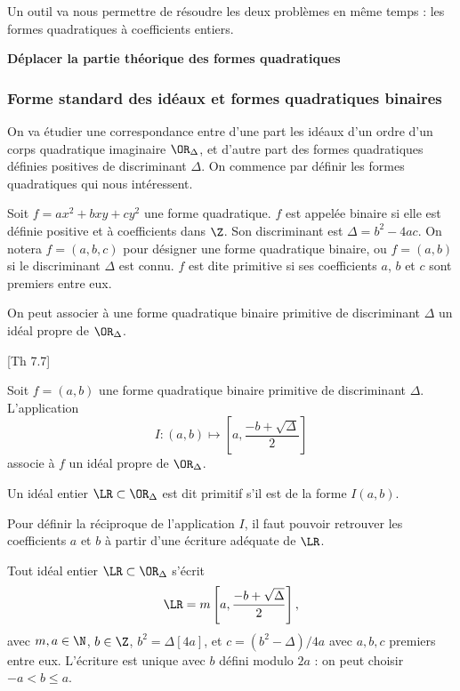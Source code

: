 Un outil va nous permettre de résoudre les deux problèmes en même temps : les formes quadratiques à coefficients entiers. 



\textbf{Déplacer la partie théorique des formes quadratiques}


\subsubsection{Forme standard des idéaux et formes quadratiques binaires}

On va étudier une correspondance entre d'une part les idéaux d'un ordre d'un corps quadratique imaginaire $\OR_{\Delta}$, et d'autre part des formes quadratiques définies positives de discriminant $\Delta$. On commence par définir les formes quadratiques qui nous intéressent.

\begin{Def}
	
	Soit $f = ax^2 + bxy + cy^2$ une forme quadratique. $f$ est appelée binaire si elle est définie positive et à coefficients dans $\Z$. Son discriminant est $\Delta = b^2 - 4ac$. On notera $f = (a,b,c)$ pour désigner une forme quadratique binaire, ou $f = (a,b)$ si le discriminant $\Delta$ est connu. $f$ est dite primitive si ses coefficients $a$, $b$ et $c$ sont premiers entre eux.
\end{Def}

On peut associer à une forme quadratique binaire primitive de discriminant $\Delta$ un idéal propre de $\OR_{\Delta}$.

\begin{Prop}\cite{Coh00}[Th 7.7]
	
	Soit $f = (a,b)$ une forme quadratique binaire primitive de discriminant $\Delta$. L'application
	\begin{equation*}
		I : (a,b)\mapsto\left[ a, \frac{-b + \sqrt{\Delta}}{2}\right] 
	\end{equation*}
	associe à $f$ un idéal propre de $\OR_{\Delta}$.
\end{Prop}

\begin{Def}
	Un idéal entier $\LR\subset\OR_{\Delta}$ est dit primitif s'il est de la forme $I(a,b)$. 
\end{Def}

Pour définir la réciproque de l'application $I$, il faut pouvoir retrouver les coefficients $a$ et $b$ à partir d'une écriture adéquate de $\LR$.

\begin{Prop}
	
	Tout idéal entier $\LR\subset\OR_{\Delta}$ s'écrit 
	\begin{equation*}
		\LR = m\left[ a , \frac{-b + \sqrt{\Delta}}{2}\right],
	\end{equation*}
	avec $m,a \in\N$, $b\in\Z$, $b^{2} = \Delta [4a]$, et $c = (b^2 -\Delta)/4a$ avec $a, b, c$ premiers entre eux. L'écriture est unique avec $b$ défini modulo $2a$ : on peut choisir $-a<b\leq a$.
\end{Prop}

